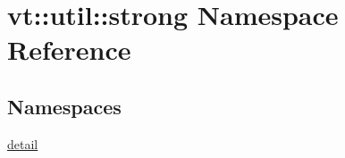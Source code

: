 \hypertarget{namespacevt_1_1util_1_1strong}{}\section{vt\+:\+:util\+:\+:strong Namespace Reference}
\label{namespacevt_1_1util_1_1strong}
\subsection*{Namespaces}
\begin{DoxyCompactItemize}
\item 
 \hyperlink{namespacevt_1_1util_1_1strong_1_1detail}{detail}
\end{DoxyCompactItemize}
